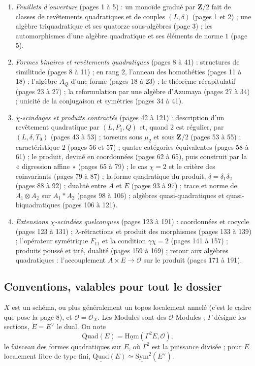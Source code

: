 \documentclass[11pt,a4paper]{article}
\begin{document}
\begin{enumerate}
\item[0.] \emph{Feuillets d'ouverture} (pages 1 à 5) : un monoïde gradué par
$\mathbf{Z}/2$ fait de classes de revêtements quadratiques et de couples
$(L, \delta)$ (pages 1 et 2) ; une algèbre triquadratique et ses quatorze
sous-algèbres (page 3) ; les automorphismes d'une algèbre quadratique et ses
éléments de norme $1$ (page 5).
\item[I.] \emph{Formes binaires et revêtements quadratiques} (pages 8 à 41) :
structures de similitude (pages 8 à 11) ; en rang $2$, l'anneau des homothéties
(pages 11 à 18) ; l'algèbre $A_Q$ d'une forme (pages 18 à 23) ; le théorème
récapitulatif (pages 23 à 27) ; la reformulation par une algèbre d'Azumaya
(pages 27 à 34) ; unicité de la conjugaison et symétries (pages 34 à 41).
\item[II.] \emph{$\chi$-scindages et produits contractés} (pages 42 à 121) :
description d'un revêtement quadratique par $(L, P_1, Q)$ et, quand $2$ est
régulier, par $(L, \delta, T_0)$ (pages 43 à 53) ; torseurs sous $\mu_2$ et sous
$\mathbf{Z}/2$ (pages 53 à 55) ; caractéristique $2$ (pages 56 et 57) ; quatre
catégories équivalentes (pages 58 à 61) ; le produit, deviné en coordonnées
(pages 62 à 65), puis construit par la « digression affine » (pages 65 à 79) ;
le cas $\chi = 2$ et le critère des coinvariants (pages 79 à 87) ; la forme
quadratique du produit, $\delta = \delta_1\delta_2$ (pages 88 à 92) ; dualité
entre $A$ et $E$ (pages 93 à 97) ; trace et norme de $A_1 \otimes A_2$ sur
$A_1 * A_2$ (pages 98 à 106) ; algèbres quasi-quadratiques et
quasi-biquadratiques (pages 106 à 121).
\item[III.] \emph{Extensions $\chi$-scindées quelconques} (pages 123 à 191) :
coordonnées et cocycle (pages 123 à 131) ; $\lambda$-rétractions et produit des
morphismes (pages 133 à 139) ; l'opérateur symétrique $F_{11}$ et la condition
$\gamma\chi = 2$ (pages 141 à 157) ; produits poussé et tiré, dualité (pages 159
à 169) ; retour aux algèbres quadratiques : l'accouplement $A \times E \to
\mathcal{O}$ sur le produit (pages 171 à 191).
\end{enumerate}

\subsection*{Conventions, valables pour tout le dossier}

$X$ est un schéma, ou plus généralement un topos localement annelé (c'est le
cadre que pose la page 8), et $\mathcal{O} = \mathcal{O}_X$. Les Modules sont des
$\mathcal{O}$-Modules ; $\Gamma$ désigne les sections, $\check{E} = E^{\vee}$ le dual.
On note
\[
  \underline{\mathrm{Quad}}(E) = \underline{\mathrm{Hom}}(\Gamma^{2}E, \mathcal{O}),
\]
le faisceau des formes quadratiques sur $E$, où $\Gamma^{2}$ est la puissance
divisée ; pour $E$ localement libre de type fini,
$\underline{\mathrm{Quad}}(E) \simeq \underline{\mathrm{Sym}}^{2}(E^{\vee})$.
\end{document}
